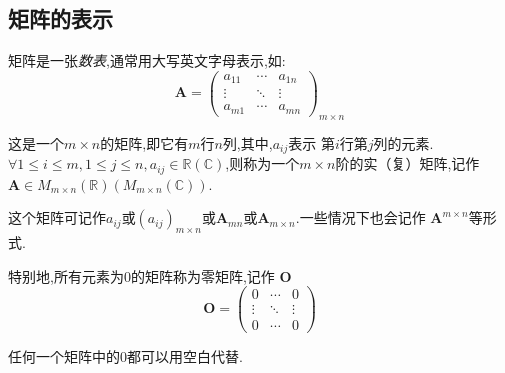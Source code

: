 \subsection{矩阵的表示}
\begin{formal}
\begin{definition}[矩阵的形式]\label{def:矩阵的形式}
矩阵是一张\emph{数表},通常用大写英文字母表示,如:
\[  
    \bm{A} = \begin{pmatrix}
        a_{11}  & \cdots & a_{1n} \\
        \vdots & \ddots  & \vdots \\
        a_{m1}  & \cdots & a_{mn}
    \end{pmatrix}_{m \times n}
\]

这是一个$\displaystyle m \times n$的矩阵,即它有$\displaystyle 
m$行$\displaystyle n$列,其中,$\displaystyle a_{ij}$表示
第$\displaystyle i$行第$\displaystyle j$列的元素.$\forall 1\leqslant i\leqslant m,1\leqslant j\leqslant n,a_{ij}\in \mathbb{R}\left(\mathbb{C}\right)$,则称为一个$m\times n$阶的实（复）矩阵,记作$\bm{A}\in M_{m\times n}\left(\mathbb{R}\right)\left(M_{m\times n}\left(\mathbb{C}\right)\right).$

这个矩阵可记作$\displaystyle a_{ij}$或$\displaystyle \left(
    a_{ij}
\right)_{m \times n}$或$\displaystyle \bm{A}_{mn}$或$
\bm{A}_{m \times n}$.一些情况下也会记作
$\bm{A}^{m\times n}$等形式.
\end{definition}
\end{formal}
\begin{formal}
\begin{definition}[零矩阵]\label{def:零矩阵}
特别地,所有元素为$\displaystyle 0$的矩阵称为零矩阵,记作
$\displaystyle \bm{O}$
\[
    \bm{O} = \begin{pmatrix}
        0 &\cdots &0 \\
        \vdots& \ddots &\vdots\\
        0&\cdots&0
    \end{pmatrix}
\]
\end{definition}
\end{formal}
\begin{red}
    \begin{remark}
        任何一个矩阵中的$ 0$都可以用空白代替.
    \end{remark}
\end{red}

